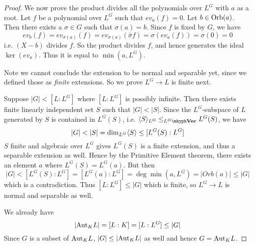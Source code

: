 \documentclass[../book.tex]{subfiles}
\begin{document}
\begin{proof}
        We now prove the product divides 
        all the polynomials over $L^G$ with $a$ as a root.
        Let $f$ be a polynomial over $L^G$ such that $ev_a(f) = 0$.
        Let $b\in \mathrm{Orb}(a)$. 
        Then there exists a $\sigma \in G$ such that $\sigma(a) = b$.
        Since $f$ is fixed by $G$, we have
        \[
            ev_b (f) = ev_{\sigma(a)}(f) 
            = ev_{\sigma(a)}(\bar{\sigma} f)
            = \sigma (ev_a (f)) = \sigma(0) = 0
        \]
        i.e. $(X - b)$ divides $f$.
        So the product divides $f$, and hence generates the ideal $\ker(ev_a)$.
        Thus it is equal to $\min(a,L^G)$. 
        
    
        Note we cannot conclude the extension to be normal and separable yet,
        since we defined those as \emph{finite} extensions.
        So we prove $L^G \to L$ is finite next.
        
        Suppose $|G| < [L : L^G]$ where $[L : L^G]$ is possibly infinite.
        Then there exists finite linearly independent set $S$ such that $|G| < |S|$. 
        Since the $L^G$-subspace of $L$ generated by $S$ is contained in $L^G(S)$, i.e. $\<S\>_{L^G} \leq_{\vec{L^G}} L^G(S)$, 
        we have \[ 
            |G| < |S| = \dim_{L^G} \langle S\rangle \leq [L^G(S) : L^G] 
        \]
        $S$ finite and algebraic over $L^G$ gives $L^G(S)$ is a finite extension,
        and thus a separable extension as well. 
        Hence by the Primitive Element theorem,
        there exists an element $a$ where $L^G(S) = L^G(a)$. 
        But then \[
            |G| < [L^G(S) : L^G] = [L^G(a) : L^G] = \deg\min(a,L^G)
            = |Orb(a)| \leq |G|
        \]
        which is a contradiction. 
        Thus $[L : L^G] \leq |G|$ which is finite,
        so $L^G \to L$ is normal and separable as well.
    
        We already have \[
            |\mathrm{Aut}_{K}L| = [L : K] = [L : L^G] \leq |G|
        \]
        Since $G$ is a subset of $\mathrm{Aut}_{K}L$, 
        $|G| \leq |\mathrm{Aut}_{K}L|$ as well and hence $G = \mathrm{Aut}_{K}L$.  
    
\end{proof}
\end{document}
